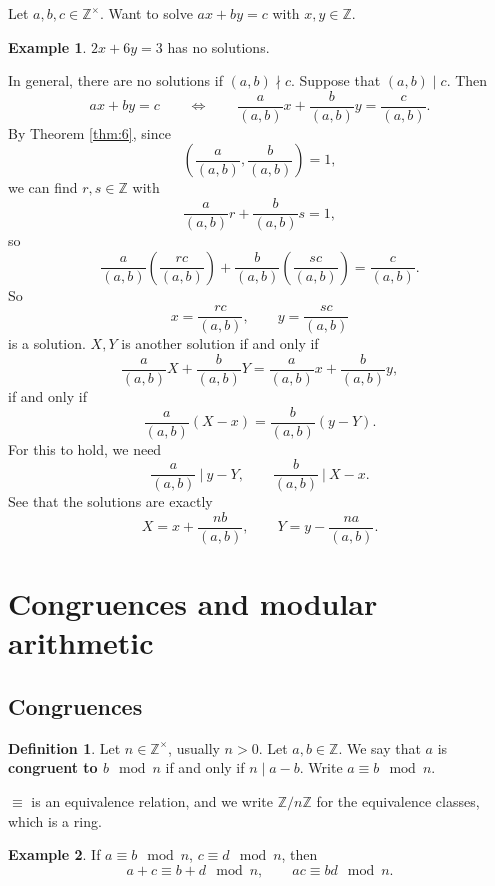 \documentclass{article}
\newcommand{\Z}{\mathbb{Z}}
\newcommand{\rb}[1]{\left( #1 \right)}
\theoremstyle{definition}\newtheorem{definition}{Definition}
\theoremstyle{definition}\newtheorem{remark}[definition]{Remark}
\theoremstyle{definition}\newtheorem*{example}{Example}
\theoremstyle{definition}\newtheorem*{note}{Note}
\begin{document}
Let $ a, b, c \in \Z^\times $. Want to solve $ ax + by = c $ with $ x, y \in \Z $.

\begin{example}
$ 2x + 6y = 3 $ has no solutions.
\end{example}

In general, there are no solutions if $ \rb{a, b} \nmid c $. Suppose that $ \rb{a, b} \mid c $. Then
$$ ax + by = c \qquad \iff \qquad \dfrac{a}{\rb{a, b}}x + \dfrac{b}{\rb{a, b}}y = \dfrac{c}{\rb{a, b}}. $$
By Theorem \ref{thm:6}, since
$$ \rb{\dfrac{a}{\rb{a, b}}, \dfrac{b}{\rb{a, b}}} = 1, $$
we can find $ r, s \in \Z $ with
$$ \dfrac{a}{\rb{a, b}}r + \dfrac{b}{\rb{a, b}}s = 1, $$
so
$$ \dfrac{a}{\rb{a, b}}\rb{\dfrac{rc}{\rb{a, b}}} + \dfrac{b}{\rb{a, b}}\rb{\dfrac{sc}{\rb{a, b}}} = \dfrac{c}{\rb{a, b}}. $$
So
$$ x = \dfrac{rc}{\rb{a, b}}, \qquad y = \dfrac{sc}{\rb{a, b}} $$
is a solution.
$ X, Y $ is another solution if and only if
$$ \dfrac{a}{\rb{a, b}}X + \dfrac{b}{\rb{a, b}}Y = \dfrac{a}{\rb{a, b}}x + \dfrac{b}{\rb{a, b}}y, $$
if and only if
$$ \dfrac{a}{\rb{a, b}}\rb{X - x} = \dfrac{b}{\rb{a, b}}\rb{y - Y}. $$
For this to hold, we need
$$ \dfrac{a}{\rb{a, b}} \ \Bigg| \ y - Y, \qquad \dfrac{b}{\rb{a, b}} \ \Bigg| \ X - x. $$
See that the solutions are exactly
$$ X = x + \dfrac{nb}{\rb{a, b}}, \qquad Y = y - \dfrac{na}{\rb{a, b}}. $$

\pagebreak

\section{Congruences and modular arithmetic}

\subsection{Congruences}

\begin{definition}
Let $ n \in \Z^\times $, usually $ n > 0 $. Let $ a, b \in \Z $. We say that $ a $ is \textbf{congruent to $ b \mod n $} if and only if $ n \mid a - b $. Write $ a \equiv b \mod n $.
\end{definition}

$ \equiv $ is an equivalence relation, and we write $ \Z / n\Z $ for the equivalence classes, which is a ring.

\begin{example}
If $ a \equiv b \mod n $, $ c \equiv d \mod n $, then
$$ a + c \equiv b + d \mod n, \qquad ac \equiv bd \mod n. $$
\end{example}
\end{document}
